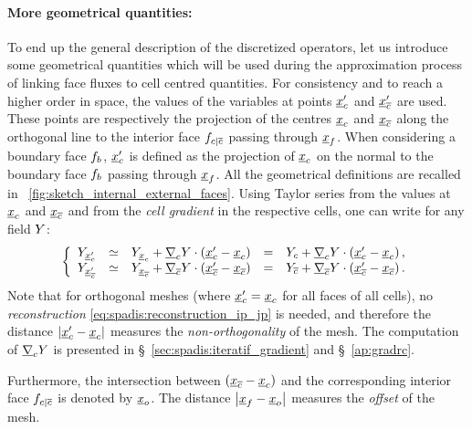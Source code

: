  \paragraph{More geometrical quantities:}
To end up the general description of the discretized operators, let us introduce some geometrical
quantities which will be used during the approximation process of linking face fluxes to
cell centred quantities.
For consistency and to reach a higher order in space, the values of the
variables at points $\centip$ and $\centjp$ are used.
These points are respectively the projection of the centres $\centi$ and $\centj$
along the orthogonal line to the interior face $\fij$ passing through $\centf$.
When considering a boundary face $\fib$, $\centip$ is defined as the projection of $\centi$
on the normal to the boundary face $\fib$ passing through $\centf$. All the geometrical
definitions are recalled in \figurename~\ref{fig:sketch_internal_external_faces}.
%
Using Taylor series from the values at $\centi$ and $\centj$ and from the \emph{cell gradient}
in the respective cells, one can write for any field $\varia$:
\begin{equation}\label{eq:spadis:reconstruction_ip_jp}
\left\lbrace
\begin{array}{r c l c l}
\varia_{\centip} &\simeq & \varia_{\centi} + \grad_{\celli} \varia \cdot \left(\centip - \centi\right) &=& \varia_{\celli} + \grad_{\celli} \varia \cdot \left(\centip - \centi\right),  \\
\varia_{\centjp} &\simeq & \varia_{\centj} + \grad_{\cellj} \varia \cdot \left(\centjp - \centj\right) & =& \varia_{\cellj} + \grad_{\cellj} \varia \cdot \left(\centjp - \centj\right).
\end{array}
\right.
\end{equation}
Note that for orthogonal meshes (where $\centip = \centi$ for all faces of all cells),
no \emph{reconstruction} \eqref{eq:spadis:reconstruction_ip_jp} is needed,
and therefore the distance $\norm{\centip - \centi}$ measures the \emph{non-orthogonality} of the mesh.
The computation of $\grad_{\celli} \varia$ is presented in  \S~\ref{sec:spadis:iteratif_gradient} and \S~\ref{ap:gradrc}.

Furthermore, the intersection between $\left(\centj - \centi\right)$ and the corresponding interior face $\fij$ is denoted by $\cento$.
The distance $\norm{\centf - \cento}$ measures the \emph{offset} of the mesh.

